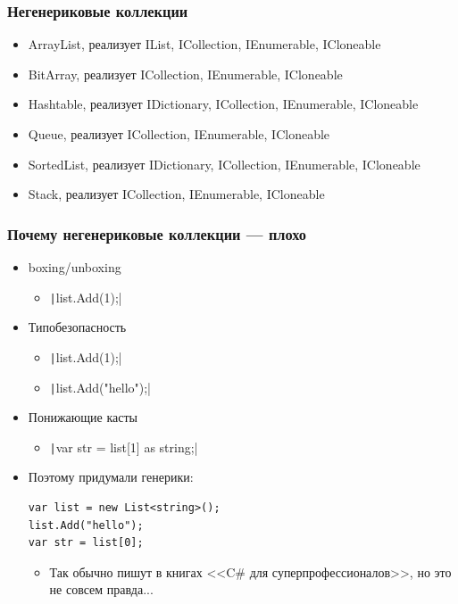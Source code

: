 \documentclass{../../slides-style}
\begin{document}
    \begin{frame}
        \frametitle{Негенериковые коллекции}
        \begin{itemize}
            \item ArrayList, реализует IList, ICollection, IEnumerable, ICloneable
            \item BitArray,  реализует ICollection, IEnumerable, ICloneable
            \item Hashtable, реализует IDictionary, ICollection, IEnumerable, ICloneable
            \item Queue, реализует ICollection, IEnumerable, ICloneable
            \item SortedList, реализует IDictionary, ICollection, IEnumerable, ICloneable
            \item Stack, реализует ICollection, IEnumerable, ICloneable
        \end{itemize}
    \end{frame}

    \begin{frame}[fragile]
        \frametitle{Почему негенериковые коллекции --- плохо}
        \begin{itemize}
            \item boxing/unboxing
            \begin{itemize}
                \item \texttt|list.Add(1);|
            \end{itemize}
            \item Типобезопасность
            \begin{itemize}
                \item \texttt|list.Add(1);|
                \item \texttt|list.Add("hello");|
            \end{itemize}
            \item Понижающие касты
            \begin{itemize}
                \item \texttt|var str = list[1] as string;|
            \end{itemize}
            \item Поэтому придумали генерики:
            \begin{verbatim}
var list = new List<string>();
list.Add("hello");
var str = list[0];
            \end{verbatim}
            \begin{itemize}
                \item Так обычно пишут в книгах <<C\# для суперпрофессионалов>>, но это не совсем правда...
            \end{itemize}
        \end{itemize}
    \end{frame}
\end{document}
